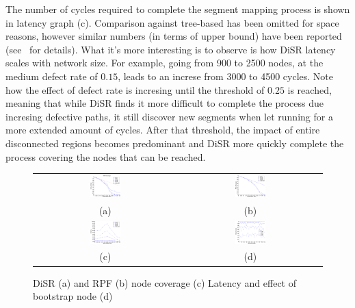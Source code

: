 The number of cycles required to complete the segment mapping
process is shown in latency graph (c). Comparison against tree-based
has been omitted for space reasons, however similar numbers (in terms
of upper bound) have been reported
(see~\cite{Patwardhan05evaluatingthe} for details). What it's more
interesting is to observe is how DiSR latency scales with network
size. For example, going from 900 to 2500 nodes, at the medium defect
rate of $0.15$, leads to an increse from 3000 to 4500 cycles. Note how
the effect of defect rate is incresing until the threshold of $0.25$
is reached, meaning that while DiSR finds it more difficult to
complete the process due incresing defective paths, it still discover
new segments when let running for a more extended amount of cycles.
After that threshold, the impact of entire disconnected regions
becomes predominant and DiSR more quickly complete the process
covering the nodes that can be reached. 

\begin{figure}
\centering
\begin{tabular}{cc}
\includegraphics[width=0.22\textwidth]{pictures/set1.eps} & 
\includegraphics[width=0.22\textwidth]{pictures/coverage.eps} \\
(a) & (b) \\
\includegraphics[width=0.22\textwidth]{pictures/set2.eps} & 
\includegraphics[width=0.22\textwidth]{pictures/set3.eps} \\
(c) & (d)
\end{tabular}
\caption{DiSR (a) and RPF (b) node coverage (c) Latency and effect
of bootstrap node (d)}
\label{fig:results}
\end{figure}

